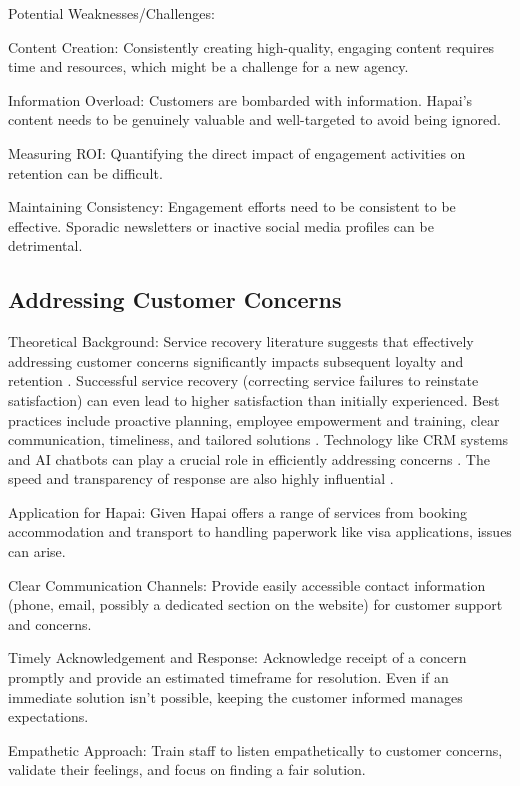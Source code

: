 \documentclass{article}
\begin{document}
Potential Weaknesses/Challenges:

Content Creation: Consistently creating high-quality, engaging content requires time and resources, which might be a challenge for a new agency.

Information Overload: Customers are bombarded with information. Hapai’s content needs to be genuinely valuable and well-targeted to avoid being ignored.

Measuring ROI: Quantifying the direct impact of engagement activities on retention can be difficult.

Maintaining Consistency: Engagement efforts need to be consistent to be effective. Sporadic newsletters or inactive social media profiles can be detrimental.

\subsection{Addressing Customer Concerns}

Theoretical Background:
Service recovery literature suggests that effectively addressing customer concerns significantly impacts subsequent loyalty and retention \cite{petzer_customer_2009}. Successful service recovery (correcting service failures to reinstate satisfaction) can even lead to higher satisfaction than initially experienced. Best practices include proactive planning, employee empowerment and training, clear communication, timeliness, and tailored solutions \cite{petzer_customer_2009}. Technology like CRM systems and AI chatbots can play a crucial role in efficiently addressing concerns \cite{ayub_artificial_2025}. The speed and transparency of response are also highly influential \cite{garg_role_2024,prados-castillo_review_2023}.

Application for Hapai:
Given Hapai offers a range of services from booking accommodation and transport to handling paperwork like visa applications, issues can arise.

Clear Communication Channels: Provide easily accessible contact information (phone, email, possibly a dedicated section on the website) for customer support and concerns.

Timely Acknowledgement and Response: Acknowledge receipt of a concern promptly and provide an estimated timeframe for resolution. Even if an immediate solution isn't possible, keeping the customer informed manages expectations.

Empathetic Approach: Train staff to listen empathetically to customer concerns, validate their feelings, and focus on finding a fair solution.
\end{document}
